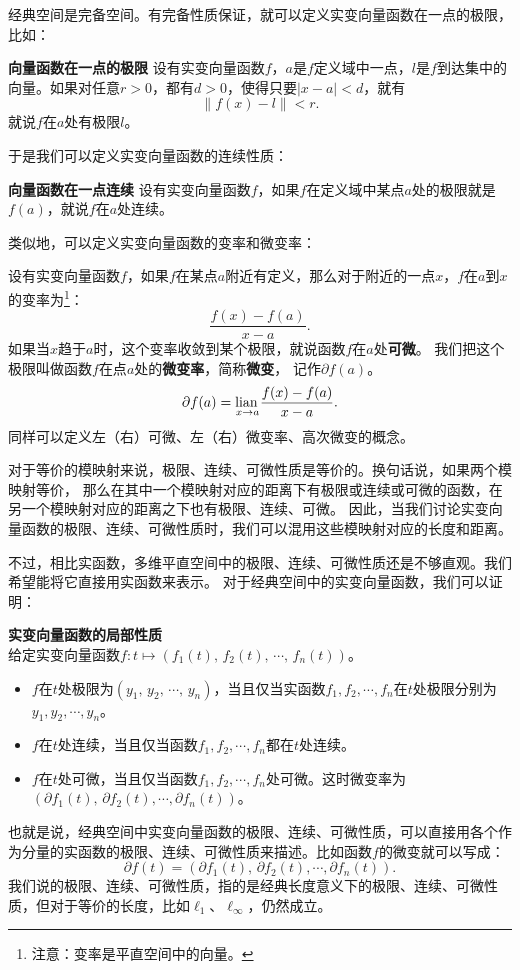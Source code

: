 \documentclass[12pt,UTF8,fontset=none]{ctexbook}
\begin{document}
经典空间是完备空间。有完备性质保证，就可以定义实变向量函数在一点的极限，比如：
\begin{df}{\textbf{向量函数在一点的极限}}
    设有实变向量函数$f$，$a$是$f$定义域中一点，$l$是$f$到达集中的向量。如果对任意$r>0$，都有$d>0$，使得只要$|x - a| < d$，就有
    $$\left\|f(x) - l\right\| < r.$$
    就说$f$在$a$处有极限$l$。
\end{df}

于是我们可以定义实变向量函数的连续性质：
\begin{df}{\textbf{向量函数在一点连续}}
    设有实变向量函数$f$，如果$f$在定义域中某点$a$处的极限就是$f(a)$，就说$f$在$a$处连续。
\end{df}

类似地，可以定义实变向量函数的变率和微变率：
\begin{df}
    设有实变向量函数$f$，如果$f$在某点$a$附近有定义，那么对于附近的一点$x$，$f$在$a$到$x$的变率为\footnote{注意：变率是平直空间中的向量。}：
    $$ \frac{f(x) - f(a)}{x - a}.$$
    如果当$x$趋于$a$时，这个变率收敛到某个极限，就说函数$f$在$a$处\textbf{可微}。
    我们把这个极限叫做函数$f$在点$a$处的\textbf{微变率}，简称\textbf{微变}，
    记作$\partial f(a)$。
    $$ \partial f(a) = \underset{{x\to a}}{\operatorname{lian}\,} \frac{f(x) - f(a)}{x - a}. $$
    同样可以定义左（右）可微、左（右）微变率、高次微变的概念。
\end{df}

对于等价的模映射来说，极限、连续、可微性质是等价的。换句话说，如果两个模映射等价，
那么在其中一个模映射对应的距离下有极限或连续或可微的函数，在另一个模映射对应的距离之下也有极限、连续、可微。
因此，当我们讨论实变向量函数的极限、连续、可微性质时，我们可以混用这些模映射对应的长度和距离。

不过，相比实函数，多维平直空间中的极限、连续、可微性质还是不够直观。我们希望能将它直接用实函数来表示。
对于经典空间中的实变向量函数，我们可以证明：
\begin{tm}\label{tm:1-1-10}
    \textbf{实变向量函数的局部性质}\\
    给定实变向量函数$f: t\mapsto (f_1(t),\, f_2(t),\, \cdots ,\, f_n(t))$。
    \begin{itemize}
        \item $f$在$t$处极限为$(y_1,\,y_2,\,\cdots,\, y_n)$，当且仅当实函数$f_1,f_2, \cdots, f_n$在$t$处极限分别为$y_1, y_2, \cdots, y_n$。
        \item $f$在$t$处连续，当且仅当函数$f_1,f_2, \cdots, f_n$都在$t$处连续。
        \item $f$在$t$处可微，当且仅当函数$f_1,f_2, \cdots, f_n$处可微。这时微变率为$(\partial f_1(t),\,\partial f_2(t), \cdots, \partial f_n(t))$。
    \end{itemize}
\end{tm}
也就是说，经典空间中实变向量函数的极限、连续、可微性质，可以直接用各个作为分量的实函数的极限、连续、可微性质来描述。比如函数$f$的微变就可以写成：
$$ \partial f (t) = (\partial f_1(t),\,\partial f_2(t), \cdots, \partial f_n(t)). $$
我们说的极限、连续、可微性质，指的是经典长度意义下的极限、连续、可微性质，但对于等价的长度，比如$\ell_1$、$\ell_{\infty}$，仍然成立。
\end{document}
